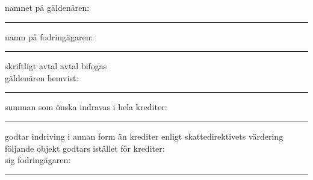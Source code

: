 \documentclass{letter}
\begin{document}
namnet på gäldenären:
\vspace*{1cm}
\hrule
namn på fodringägaren:
\vspace*{1cm}
\hrule
\Square skriftligt avtal \hspace*{10pt}\Square avtal bifogas\\
gäldenären hemvist:
\vspace*{1cm}
\hrule
summan som önska indravas i hela krediter:
\vspace*{1cm}
\hrule
\Square godtar indriving i annan form än krediter enligt skattedirektivets värdering\\
följande objekt godtars istället för krediter:\\

\vfill
sig fodringägaren:
\vspace*{1cm}
\hrule
\end{document}
